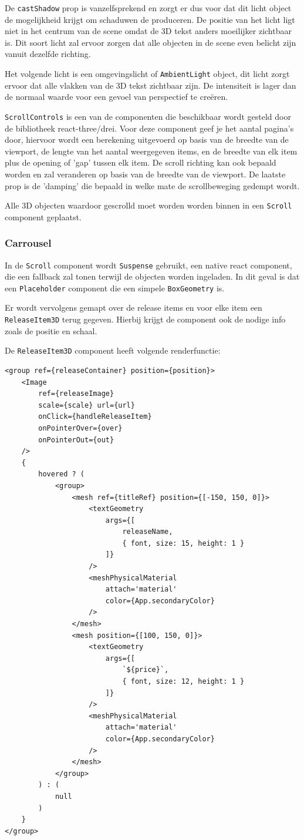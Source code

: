 De \texttt{castShadow} prop is vanzelfsprekend en zorgt er dus voor dat dit licht object de mogelijkheid krijgt om schaduwen de produceren. De positie van het licht ligt niet in het centrum van de scene omdat de 3D tekst anders moeilijker zichtbaar is. Dit soort licht zal ervoor zorgen dat alle objecten in de scene even belicht zijn vanuit dezelfde richting.

Het volgende licht is een omgevingslicht of \texttt{AmbientLight} object, dit licht zorgt ervoor dat alle vlakken van de 3D tekst zichtbaar zijn. De intensiteit is lager dan de normaal waarde voor een gevoel van perspectief te creëren.

\texttt{ScrollControls} is een van de componenten die beschikbaar wordt gesteld door de bibliotheek react-three/drei. Voor deze component geef je het aantal pagina's door, hiervoor wordt een berekening uitgevoerd op basis van de breedte van de viewport, de lengte van het aantal weergegeven items, en de breedte van elk item plus de opening of 'gap' tussen elk item. De scroll richting kan ook bepaald worden en zal veranderen op basis van de breedte van de viewport. De laatste prop is de 'damping' die bepaald in welke mate de scrollbeweging gedempt wordt.

Alle 3D objecten waardoor gescrolld moet worden worden binnen in een \texttt{Scroll} component geplaatst.

\subsubsection{Carrousel}

In de \texttt{Scroll} component wordt \texttt{Suspense} gebruikt, een native react component, die een fallback zal tonen terwijl de objecten worden ingeladen. In dit geval is dat een \texttt{Placeholder} component die een simpele \texttt{BoxGeometry} is.

Er wordt vervolgens gemapt over de release items en voor elke item een \texttt{ReleaseItem3D} terug gegeven. Hierbij krijgt de component ook de nodige info zoals de positie en schaal.

De \texttt{ReleaseItem3D} component heeft volgende renderfunctie:

\begin{lstlisting}
<group ref={releaseContainer} position={position}>
	<Image 
		ref={releaseImage} 
		scale={scale} url={url} 
		onClick={handleReleaseItem} 
		onPointerOver={over} 
		onPointerOut={out} 
	/>
	{
		hovered ? (
			<group>
				<mesh ref={titleRef} position={[-150, 150, 0]}>
					<textGeometry 
						args={[
							releaseName,
							{ font, size: 15, height: 1 }
						]} 
					/>
					<meshPhysicalMaterial 
						attach='material' 
						color={App.secondaryColor} 
					/>
				</mesh>
				<mesh position={[100, 150, 0]}>
					<textGeometry 
						args={[
							`${price}`,
							{ font, size: 12, height: 1 }
						]} 
					/>
					<meshPhysicalMaterial 
						attach='material' 
						color={App.secondaryColor} 
					/>
				</mesh>
			</group>
		) : (
			null
		)
	}
</group>
\end{lstlisting}

